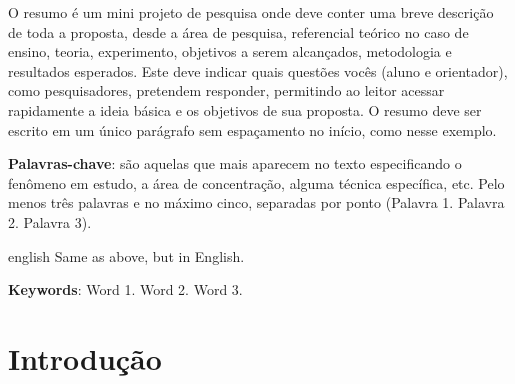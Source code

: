 \documentclass[12pt,oneside,brazil,hidelinks,article,sumario=tradicional,a4paper]{abntex2}
\renewcommand{\imprimircapa}{%
  \begin{capa}%
    \centering
    {\imprimirinstituicao\vfill}

    {\ABNTEXchapterfont\large\imprimirautor}

    \vfill
    {\ABNTEXchapterfont\bfseries\LARGE\imprimirtitulo}
    \vfill

    \large\imprimirlocal

    \large\imprimirdata

    \vspace*{15mm}
  \end{capa}
}
\begin{document}
\pretextual
\imprimircapa

\begin{resumo} %
  O resumo é um mini projeto de pesquisa onde deve conter uma breve descrição de toda a proposta, desde a área de pesquisa, referencial teórico no caso de ensino, teoria, experimento, objetivos a serem alcançados, metodologia e resultados esperados. Este deve indicar quais questões vocês (aluno e orientador), como pesquisadores, pretendem responder, permitindo ao leitor acessar rapidamente a ideia básica e os objetivos de sua proposta. O resumo deve ser escrito em um único parágrafo sem espaçamento no início, como nesse exemplo.
  \vspace{\onelineskip}

  \noindent
  \textbf{Palavras-chave}: são aquelas que mais aparecem no texto especificando o fenômeno em estudo, a área de concentração, alguma técnica específica, etc. Pelo menos três palavras e no máximo cinco, separadas por ponto (Palavra 1. Palavra 2. Palavra 3).
\end{resumo}

\begin{resumo}[Abstract] %
  \begin{otherlanguage*}{english}
    Same as above, but in English.
    \vspace{\onelineskip}

    \noindent
    \textbf{Keywords}: Word 1. Word 2. Word 3.
  \end{otherlanguage*}
\end{resumo}





\textual%

\section{Introdução}\label{sec:intro}
\end{document}
